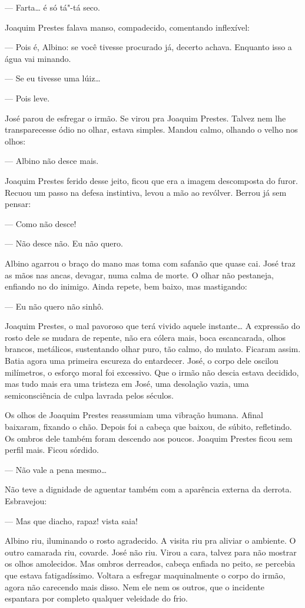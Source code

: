 \begin{linenumbers}
--- Farta\ldots{} é só tá"-tá seco.

Joaquim Prestes falava manso, compadecido, comentando inflexível:

--- Pois é, Albino: se você tivesse procurado já, decerto achava.
Enquanto isso a água vai minando.

--- Se eu tivesse uma lúiz\ldots{}

--- Pois leve.

José parou de esfregar o irmão. Se virou pra Joaquim Prestes. Talvez nem
lhe transparecesse ódio no olhar, estava simples. Mandou calmo, olhando
o velho nos olhos:

--- Albino não desce mais.

Joaquim Prestes ferido desse jeito, ficou que era a imagem descomposta
do furor. Recuou um passo na defesa instintiva, levou a mão ao revólver.
Berrou já sem pensar:

--- Como não desce!

--- Não desce não. Eu não quero.

Albino agarrou o braço do mano mas toma com safanão que quase cai. José
traz as mãos nas ancas, devagar, numa calma de morte. O olhar não
pestaneja, enfiando no do inimigo. Ainda repete, bem baixo, mas
mastigando:

--- Eu não quero não sinhô.

Joaquim Prestes, o mal pavoroso que terá vivido aquele instante\ldots{} A
expressão do rosto dele se mudara de repente, não era cólera mais, boca
escancarada, olhos brancos, metálicos, sustentando olhar puro, tão
calmo, do mulato. Ficaram assim. Batia agora uma primeira escureza do
entardecer. José, o corpo dele oscilou milímetros, o esforço moral foi
excessivo. Que o irmão não descia estava decidido, mas tudo mais era uma
tristeza em José, uma desolação vazia, uma semiconsciência de culpa
lavrada pelos séculos.

Os olhos de Joaquim Prestes reassumiam uma vibração humana. Afinal
baixaram, fixando o chão. Depois foi a cabeça que baixou, de súbito,
refletindo. Os ombros dele também foram descendo aos poucos. Joaquim
Prestes ficou sem perfil mais. Ficou sórdido.

--- Não vale a pena mesmo\ldots{}

Não teve a dignidade de aguentar também com a aparência externa da
derrota. Esbravejou:

--- Mas que diacho, rapaz! vista saia!

Albino riu, iluminando o rosto agradecido. A visita riu pra aliviar o
ambiente. O outro camarada riu, covarde. José não riu. Virou a cara,
talvez para não mostrar os olhos amolecidos. Mas ombros derreados,
cabeça enfiada no peito, se percebia que estava fatigadíssimo. Voltara a
esfregar maquinalmente o corpo do irmão, agora não carecendo mais disso.
Nem ele nem os outros, que o incidente espantara por completo qualquer
veleidade do frio.


\end{linenumbers}

